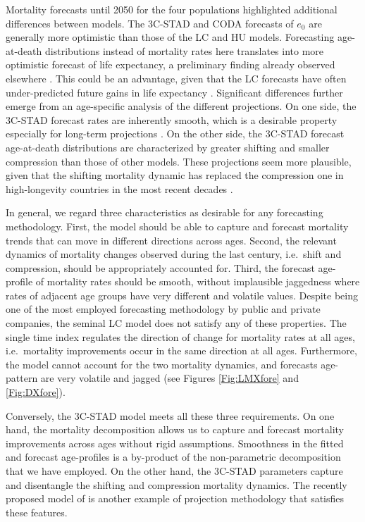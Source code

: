 \documentclass[Thesis]{subfiles}
\begin{document}
Mortality forecasts until 2050 for the four populations highlighted additional differences between models. The 3C-STAD and CODA forecasts of $e_{0}$ are generally more optimistic than those of the LC and HU models. Forecasting age-at-death distributions instead of mortality rates here translates into more optimistic forecast of life expectancy, a preliminary finding already observed elsewhere \citep{bergeron2019impact}. This could be an advantage, given that the LC forecasts have often under-predicted future gains in life expectancy \citep{lee2001evaluating}. Significant differences further emerge from an age-specific analysis of the different projections. On one side, the 3C-STAD forecast rates are inherently smooth, which is a desirable property especially for long-term projections \citep{li2013extending}. On the other side, the 3C-STAD forecast age-at-death distributions are characterized by greater shifting and smaller compression than those of other models. These projections seem more plausible, given that the shifting mortality dynamic has replaced the compression one in high-longevity countries in the most recent decades \citep{canudas2008modal,bergeron2015decomposing,janssen2019timing}. 

In general, we regard three characteristics as desirable for any forecasting methodology. First, the model should be able to capture and forecast mortality trends that can move in different directions across ages. Second, the relevant dynamics of mortality changes observed during the last century, i.e.~shift and compression, should be appropriately accounted for. Third, the forecast age-profile of mortality rates should be smooth, without implausible jaggedness where rates of adjacent age groups have very different and volatile values. Despite being one of the most employed forecasting methodology by public and private companies, the seminal LC model does not satisfy any of these properties. The single time index regulates the direction of change for mortality rates at all ages, i.e.~mortality improvements occur in the same direction at all ages. Furthermore, the model cannot account for the two mortality dynamics, and forecasts age-pattern are very volatile and jagged (see Figures \ref{Fig:LMXfore} and \ref{Fig:DXfore}).

Conversely, the 3C-STAD model meets all these three requirements. On one hand, the mortality decomposition allows us to capture and forecast mortality improvements across ages without rigid assumptions. Smoothness in the fitted and forecast age-profiles is a by-product of the non-parametric decomposition that we have employed. On the other hand, the 3C-STAD parameters capture and disentangle the shifting and compression mortality dynamics. The recently proposed model of \cite{bardoutsos2018projecting} is another example of projection methodology that satisfies these features.
\end{document}
